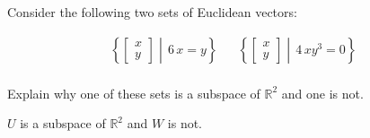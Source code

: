 
\begin{exerciseStatement}


Consider the following two sets of Euclidean vectors: 


\begin{align*}  \left\{ \left[\begin{array}{c}
x \\
y
\end{array}\right] \middle|\,6 \, x = y\right\}  & &   \left\{ \left[\begin{array}{c}
x \\
y
\end{array}\right] \middle|\,4 \, x y^{3} = 0\right\}  \\ \end{align*}
            

 Explain why one of these sets is a subspace of \(\mathbb{R}^ 2 \) and one is not. 


\end{exerciseStatement}
    
\begin{exerciseAnswer} 


\(U\) is a subspace of \(\mathbb{R}^ 2 \) and \(W\) is not.


\end{exerciseAnswer}
    
